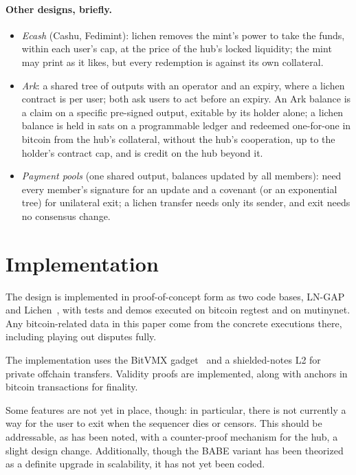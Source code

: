 \documentclass[11pt]{article}
\begin{document}
\paragraph{Other designs, briefly.}
\begin{itemize}[leftmargin=1.5em]
\item \emph{Ecash} (Cashu, Fedimint): lichen removes the mint's power to
  take the funds, within each user's cap, at the price of the hub's
  locked liquidity; the mint may print as it likes, but every redemption
  is against its own collateral.
\item \emph{Ark}: a shared tree of outputs with an operator and an
  expiry, where a lichen contract is per user; both ask users to act
  before an expiry. An Ark balance is a claim on a specific pre-signed
  output, exitable by its holder alone; a lichen balance is held in sats
  on a programmable ledger and redeemed one-for-one in bitcoin from the
  hub's collateral, without the hub's cooperation, up to the holder's
  contract cap, and is credit on the hub beyond it.
\item \emph{Payment pools} (one shared output, balances updated by all
  members): need every member's signature for an update and a covenant
  (or an exponential tree) for unilateral exit; a lichen transfer needs
  only its sender, and exit needs no consensus change.
\end{itemize}

\section{Implementation}
\label{sec:status}

The design is implemented in proof-of-concept form as two code bases, LN-GAP~\cite{lngapcode} and Lichen~\cite{lichencode}, with tests and demos executed on bitcoin regtest and on mutinynet. Any bitcoin-related data in this paper come from the concrete executions there, including playing out disputes fully.

The implementation uses the BitVMX gadget~\cite{lichenbitvmx} and a shielded-notes L2 for private offchain transfers. Validity proofs are implemented, along with anchors in bitcoin transactions for finality.

Some features are not yet in place, though: in particular, there is not currently a way for the user to exit when the sequencer dies or censors. This should be addressable, as has been noted, with a counter-proof mechanism for the hub, a slight design change. Additionally, though the BABE variant has been theorized as a definite upgrade in scalability, it has not yet been coded.
\end{document}
